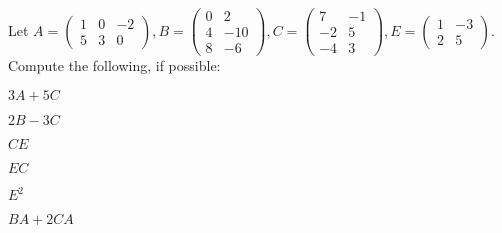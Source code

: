 \documentclass[crop=false,class=book,oneside]{standalone}
\begin{document}
    \clearpage
    \begin{problem}
    Let $A = \begin{pmatrix} 1 & 0 & -2 \\ 5 & 3 & 0 \end{pmatrix}, B = \begin{pmatrix} 0 & 2 \\ 4 & -10 \\ 8 & -6 \end{pmatrix}, C = \begin{pmatrix} 7 & -1 \\ -2 & 5 \\ -4 & 3 \end{pmatrix}, E = \begin{pmatrix} 1 & -3 \\ 2 & 5 \end{pmatrix}$. Compute the following, if possible:
    \begin{enumerate}
    \begin{multicols}{6}
        \item $3A+5C$
        \item $2B-3C$
        \item $CE$
        \item $EC$
        \item $E^2$
        \item $BA+2CA$
    \end{multicols}
    \end{enumerate}
    \end{problem}
\end{document}
